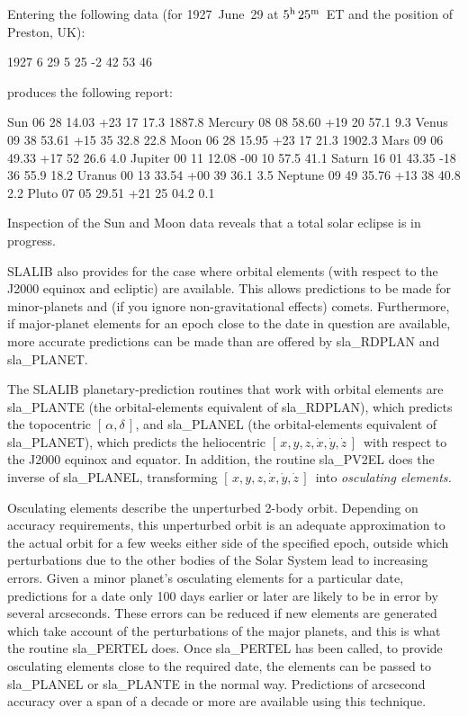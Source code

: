 \documentclass[11pt,twoside,nolof]{starlink}
\providecommand{\radec}     {$[\,\alpha,\delta\,]$}
\providecommand{\xyzxyzd}   {$[\,x,y,z,\dot{x},\dot{y},\dot{z}\,]$}
\begin{document}
Entering the following data (for 1927~June~29 at $5^{\rm h}\,25^{\rm m}$~ET
and the position of Preston, UK):
\begin{terminalv}
      1927 6 29
      5 25
      -2 42
      53 46
\end{terminalv}
produces the following report:
\begin{terminalv}
      Sun       06 28 14.03  +23 17 17.3  1887.8
      Mercury   08 08 58.60  +19 20 57.1     9.3
      Venus     09 38 53.61  +15 35 32.8    22.8
      Moon      06 28 15.95  +23 17 21.3  1902.3
      Mars      09 06 49.33  +17 52 26.6     4.0
      Jupiter   00 11 12.08  -00 10 57.5    41.1
      Saturn    16 01 43.35  -18 36 55.9    18.2
      Uranus    00 13 33.54  +00 39 36.1     3.5
      Neptune   09 49 35.76  +13 38 40.8     2.2
      Pluto     07 05 29.51  +21 25 04.2     0.1
\end{terminalv}
Inspection of the Sun and Moon data reveals that
a total solar eclipse is in progress.

SLALIB also provides for the case where orbital elements (with respect
to the J2000 equinox and ecliptic)
are available.  This allows predictions to be made for minor-planets and
(if you ignore non-gravitational effects)
comets.  Furthermore, if major-planet elements for an epoch close to the date
in question are available, more accurate predictions can be made than
are offered by
sla\_RDPLAN and
sla\_PLANET.

The SLALIB planetary-prediction
routines that work with orbital elements are
sla\_PLANTE (the orbital-elements equivalent of
sla\_RDPLAN), which predicts the topocentric \radec, and
sla\_PLANEL (the orbital-elements equivalent of
sla\_PLANET), which predicts the heliocentric \xyzxyzd\ with respect to the
J2000 equinox and equator.  In addition, the routine
sla\_PV2EL does the inverse of
sla\_PLANEL, transforming \xyzxyzd\ into \textit{osculating elements.}

Osculating elements describe the unperturbed 2-body orbit.  Depending
on accuracy requirements, this unperturbed orbit is an
adequate approximation to the actual orbit for a few weeks either
side of the specified epoch, outside which perturbations due to
the other bodies of the Solar System lead to
increasing errors.  Given a minor planet's osculating elements for
a particular date, predictions for a date only
100 days earlier or later
are likely to be in error by several arcseconds.
These errors can
be reduced if new elements are generated which take account of
the perturbations of the major planets, and this is what the routine
sla\_PERTEL does.  Once
sla\_PERTEL has been called, to provide osculating elements
close to the required date, the elements can be passed to
sla\_PLANEL or
sla\_PLANTE in the normal way.  Predictions of arcsecond accuracy
over a span of a decade or more are available using this
technique.
\end{document}
